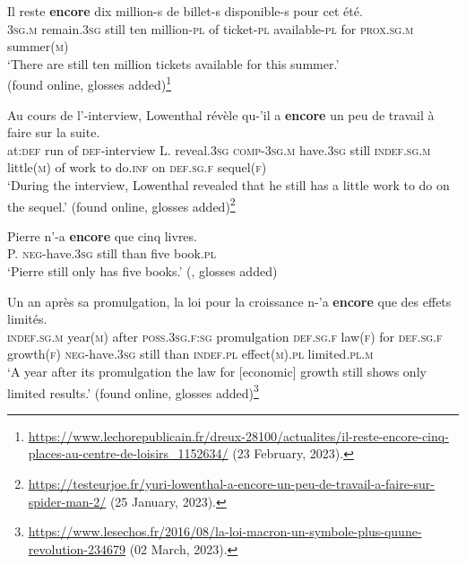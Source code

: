 \begin{exe}
	\ex \label{exAppendixFrenchEncoreScalar1}
	\gll Il reste \textbf{encore} dix million-s de billet-s disponible-s pour cet été.\\
	3\textsc{sg}.\textsc{m} remain.3\textsc{sg} still ten million-\textsc{pl} of ticket-\textsc{pl} available-\textsc{pl} for \textsc{prox}.\textsc{sg}.\textsc{m} summer(\textsc{m})\\
	\glt \lq There are still ten million tickets available for this summer.\rq{}
	\\(found online, glosses added)\footnote{\url{https://www.lechorepublicain.fr/dreux-28100/actualites/il-reste-encore-cinq-places-au-centre-de-loisirs_1152634/} (23 February, 2023).}

	\ex \label{exAppendixFrenchEncoreScalar2}
	\gll Au cours de l’-interview, Lowenthal révèle qu-’il a \textbf{encore} un peu de travail à faire sur la suite.\\
	at:\textsc{def} run of \textsc{def}-interview L. reveal.3\textsc{sg} \textsc{comp}-3\textsc{sg}.\textsc{m} have.3\textsc{sg} still \textsc{indef}.\textsc{sg}.\textsc{m} little(\textsc{m}) of work to do.\textsc{inf} on \textsc{def}.\textsc{sg}.\textsc{f} sequel(\textsc{f})\\
	\glt \lq During the interview, Lowenthal revealed that he still has a little work to do on the sequel.\rq{ }(found online, glosses added)\footnote{\url{https://testeurjoe.fr/yuri-lowenthal-a-encore-un-peu-de-travail-a-faire-sur-spider-man-2/} (25 January, 2023).}
	
	\ex \label{exAppendixFrenchEncoreScalar3}
	\gll Pierre n'-a \textbf{encore} que cinq livres.\\
	P. \textsc{neg}-have.3\textsc{sg} still than five book.\textsc{pl}\\
	\glt \lq Pierre still only has five books.\rq{ }(\cite[108]{MosegaardHansen2008}, glosses added)
	
	\ex \label{exAppendixFrenchEncoreScalar4}
	\gll Un an après sa promulgation, la loi pour la croissance n-'a \textbf{encore} que des effets limités.\\
	\textsc{indef}.\textsc{sg}.\textsc{m} year(\textsc{m}) after \textsc{poss}.3\textsc{sg}.\textsc{f}:\textsc{sg} promulgation \textsc{def}.\textsc{sg}.\textsc{f} law(\textsc{f}) for \textsc{def}.\textsc{sg}.\textsc{f} growth(\textsc{f}) \textsc{neg}-have.3\textsc{sg} still than \textsc{indef}.\textsc{pl} effect(\textsc{m}).\textsc{pl} limited.\textsc{pl}.\textsc{m}\\
	\glt \lq A year after its promulgation the law for [economic] growth still shows only limited results.\rq{ }(found online, glosses added)\footnote{\url{https://www.lesechos.fr/2016/08/la-loi-macron-un-symbole-plus-quune-revolution-234679} (02 March, 2023).}
\end{exe}


